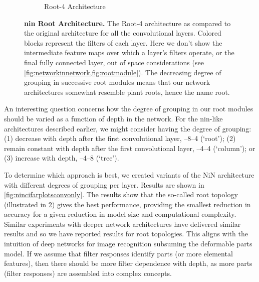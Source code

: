 \documentclass[thesis]{subfiles}
\begin{document}
{\begin{landscape}
\begin{figure}[p]
\begin{subfigure}[b]{0.98\linewidth}
			\caption{Root-4 Architecture}
			\label{fig:root4topology}
		\end{subfigure}
		\caption[\Gls{nin} standard \vs root architecture]{\textbf{\Gls{nin} Root Architecture.} The Root-4 architecture as compared to the original architecture for all the convolutional layers. Colored blocks represent the filters of each layer. Here we don't show the intermediate feature maps over which a layer's filters operate, or the final fully connected layer, out of space considerations (see \cref{fig:networkinnetwork,fig:rootmodule}). The decreasing degree of grouping in successive root modules means that our network architectures somewhat resemble plant roots, hence the name root.
		}\label{fig:networktopology}
	\end{figure}
	\end{landscape}
	}
	An interesting question concerns how the degree of grouping in our root modules should be varied as a function of depth in the network. For the \gls{nin}-like architectures described earlier, we might consider having the degree of grouping: (1) decrease with depth after the first convolutional layer, --8--4 (`root'); (2) remain constant with depth after the first convolutional layer, --4--4 (`column'); or (3) increase with depth, --4--8 (`tree').
	
	To determine which approach is best, we created variants of the NiN architecture with different degrees of grouping per layer. Results are shown in \cref{fig:nincifarplotsconvonly}. The results show that the so-called root topology (illustrated in \cref{fig:networktopology}) gives the best performance, providing the smallest reduction in accuracy for a given reduction in model size and computational complexity. Similar experiments with deeper network architectures have delivered similar results and so we have reported results for root topologies. This aligns with the intuition of deep networks for image recognition subsuming the deformable parts model. If we assume that filter responses identify parts (or more elemental features), then there should be more filter dependence with depth, as more parts (filter responses) are assembled into complex concepts.
	
\end{document}
